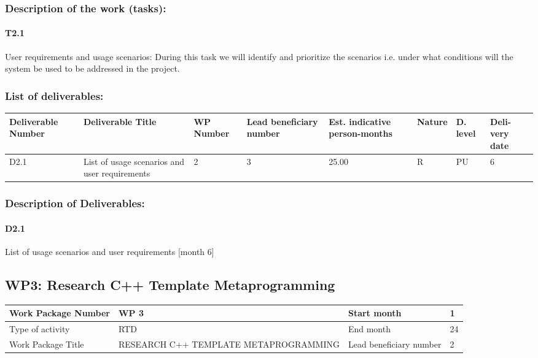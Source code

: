\documentclass{article}
\begin{document}
\subsubsection{Description of the work (tasks):}
\paragraph{T2.1} User requirements and usage scenarios: During this task we will identify and prioritize the scenarios i.e. under what conditions will the system be used
to be addressed in the project. 
\subsubsection{List of deliverables:}
\begin{center}
	\begin{tabular}{ |p{1.6cm}|p{2cm}|p{0.8cm}|p{0.8cm}|p{0.9cm}|p{1cm}|p{0.5cm}|p{0.8cm}| }
		\hline
		Deliverable Number & Deliverable Title & WP Number & Lead beneficiary number & Est. indicative person-months & Nature & D. level & Deli-very date \\ \hline
		D2.1 & List of usage scenarios and user requirements & 2 & 3 & 25.00 & R & PU & 6 \\ \hline
	\end{tabular}
\end{center}

\subsubsection{Description of Deliverables:}
\paragraph{D2.1} List of usage scenarios and user requirements [month 6]

\newpage

\subsection{WP3: Research C++ Template Metaprogramming}

\begin{center}
	\begin{tabular}{ |p{3cm}|p{4cm}||p{2cm}|p{1cm}| }
		\hline
		Work Package Number & WP 3 & Start month & 1  \\ \hline
		Type of activity & RTD & End month & 24 \\ \hline
		Work Package Title & RESEARCH C++ TEMPLATE METAPROGRAMMING & Lead beneficiary number & 2 \\ \hline
	\end{tabular}
\end{center}
\end{document}

